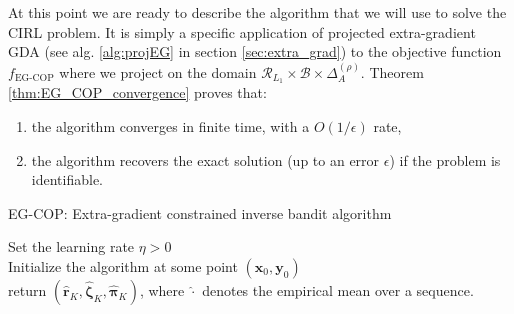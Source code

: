 At this point we are ready to describe the algorithm that we will use to solve the CIRL problem. It is simply a specific application of projected extra-gradient GDA (see alg. \ref{alg:projEG} in section \ref{sec:extra_grad}) to the objective function $f_\text{EG-COP}$ where we project on the domain $\mathcal{R}_{L_1}\times \mathcal{B} \times \Delta_A^{(\rho)}$. Theorem \ref{thm:EG_COP_convergence} proves that:
\begin{enumerate}
    \item the algorithm converges in finite time, with a $O(1/\epsilon)$ rate,
    \item the algorithm recovers the exact solution (up to an error $\epsilon$) if the problem is identifiable.
\end{enumerate}

\begin{algorithm}
    \SetAlgoLined
  \small
    \caption{EG-COP: Extra-gradient constrained inverse bandit algorithm}
    \label{alg:eg-cop}
      Set the learning rate $\eta >0$ \\
      Initialize the algorithm at some point $(\bm{x}_0,\bm{y}_0)$  \\
      return $(\hat{\bm{r}}_K,\hat{\bm{\zeta}}_K,\hat{\bm{\pi}}_K)$, where $\hat{\cdot}$ denotes the empirical mean over a sequence.
  \end{algorithm}


